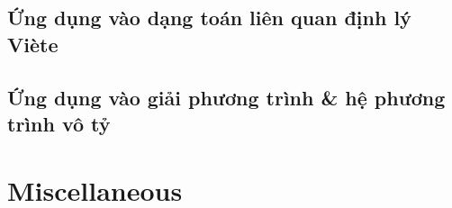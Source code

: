 \documentclass{article}
\begin{document}
\subsection{Ứng dụng vào dạng toán liên quan định lý Vi\`ete}

\subsection{Ứng dụng vào giải phương trình \& hệ phương trình vô tỷ}


\section{Miscellaneous}


\printbibliography[heading=bibintoc]
\end{document}
